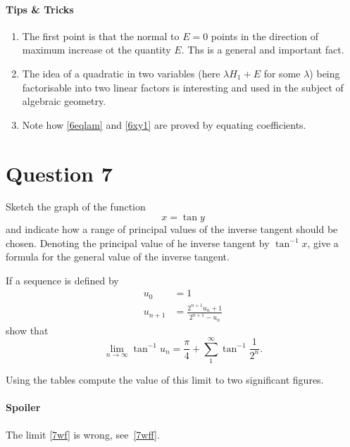 \documentclass[11pt,a4paper]{report}
\theoremstyle{plain}
\theoremstyle{definition}
\begin{document}
\paragraph{Tips \& Tricks} 
\begin{enumerate}[nosep]
\item The first point is that the normal to $ E=0 $ points in the direction of maximum increase ot the quantity $ E $.  Ths is a general and important fact.

\item The idea of a quadratic in two variables (here $ \lambda H_1 + E $ for some $ \lambda $) being factorisable into two linear factors is interesting and used in the subject of algebraic geometry. 

\item Note how \eqref{6eqlam} and \eqref{6xy1}  are proved by equating coefficients.
\end{enumerate} 





\newpage
\section*{Question 7}

Sketch the graph of the function 
\[
 x = \tan y 
\] 
and indicate how a range of principal values of the inverse tangent should be chosen.
Denoting the principal value of he inverse tangent by $ \tan^{-1} x $, give a formula for the general value of the inverse tangent.

If a sequence is defined by 
\begin{equation} \label{undef} 
\begin{aligned}
u_0 &=1 \\
u_{n+1} &= \frac{2^{n+1} u_n +1 }{2^{n+1} - u_n }
\end{aligned}
\end{equation} 
show that 
\begin{equation} \label{7wf} 
 \lim_{n\to\infty } \tan^{-1} u_n = \dfrac{\pi}{4} + \sum_1^\infty \tan^{-1} \dfrac{1}{2^n}.
\end{equation} 

Using the tables compute the value of this limit to two significant figures.

  
\bigskip
\paragraph{\color{red}Spoiler}  The limit \eqref{7wf} is wrong, see~\eqref{7wff}.
\end{document}
